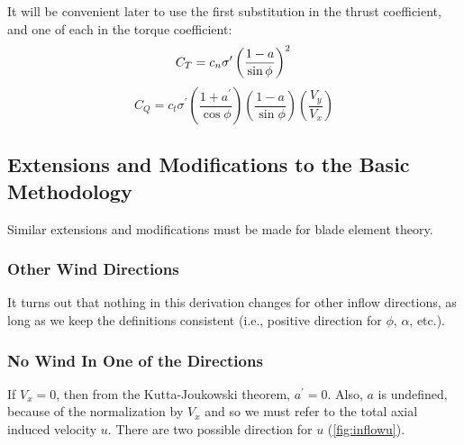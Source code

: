 \documentclass{article}
\begin{document}
It will be convenient later to use the first substitution in the thrust coefficient, and one of each in the torque coefficient:
\begin{equation}
    C_T = c_n \sigma^\prime \left(\frac{1-a}{\sin\phi}\right)^2\\
    \label{eq:CTbe}
\end{equation}
\begin{equation}
    C_Q = c_t \sigma^\prime \left(\frac{1 + a^\prime}{\cos\phi}\right)\left(\frac{1 - a}{\sin\phi}\right)\left(\frac{V_y}{V_x}\right)
    \label{eq:CQbe}
\end{equation}

\subsection{Extensions and Modifications to the Basic Methodology}

Similar extensions and modifications must be made for blade element theory.

\subsubsection{Other Wind Directions}

It turns out that nothing in this derivation changes for other inflow directions, as long as we keep the definitions consistent (i.e., positive direction for $\phi$, $\alpha$, etc.).


\subsubsection{No Wind In One of the Directions}
\label{sec:nowindtan}

If $V_x = 0$, then from the Kutta-Joukowski theorem, $a^\prime = 0$.  Also, $a$ is undefined, because of the normalization by $V_x$ and so we must refer to the total axial induced velocity $u$.  There are two possible direction for $u$ (\cref{fig:inflowu}).
\end{document}
